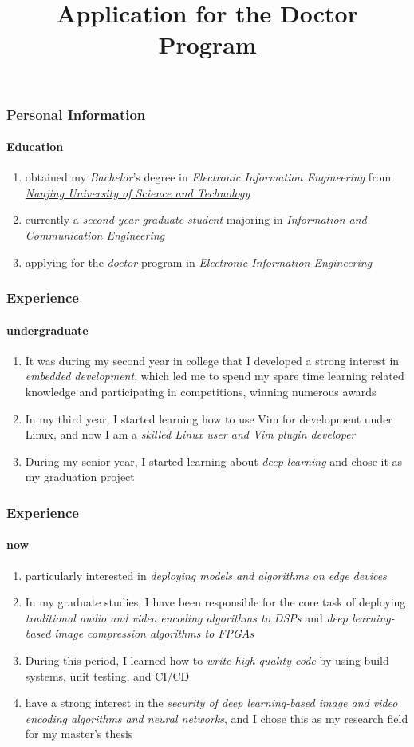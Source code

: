 \documentclass[aspectratio=169]{beamer}
\title{Application for the Doctor Program}
\begin{document}
\maketitle

\begin{frame}
  \frametitle{Personal Information}
  \framesubtitle{Education}
  \begin{enumerate}
    \item obtained my \emph{Bachelor}'s degree in \emph{Electronic Information
            Engineering} from \href{https://njust.edu.cn}{\emph{Nanjing
              University of Science and Technology}}
    \item currently a \emph{second-year graduate student} majoring in
          \emph{Information and Communication Engineering}
    \item applying for the \emph{doctor} program in
          \emph{Electronic Information Engineering}
  \end{enumerate}
\end{frame}

\begin{frame}
  \frametitle{Experience}
  \framesubtitle{undergraduate}
  \begin{enumerate}
    \item It was during my second year in college that I developed a strong
          interest in \emph{embedded development}, which led me to spend my spare
          time learning related knowledge and participating in competitions, winning
          numerous awards
    \item In my third year, I started learning how to use Vim for development
          under Linux, and now I am a \emph{skilled Linux user and Vim plugin
            developer}
    \item During my senior year, I started learning about \emph{deep learning}
          and chose it as my graduation project
  \end{enumerate}
\end{frame}

\begin{frame}
  \frametitle{Experience}
  \framesubtitle{now}
  \begin{enumerate}
    \item particularly interested in \emph{deploying models and algorithms on
            edge devices}
    \item In my graduate studies, I have been responsible for the core task of
          deploying \emph{traditional audio and video encoding algorithms to DSPs}
          and \emph{deep learning-based image compression algorithms to FPGAs}
    \item During this period, I learned how to \emph{write high-quality code}
          by using build systems, unit testing, and CI/CD
    \item have a strong interest in the \emph{security of deep learning-based
            image and video encoding algorithms and neural networks}, and I
          chose this as my research field for my master's thesis
  \end{enumerate}
\end{frame}
\end{document}
